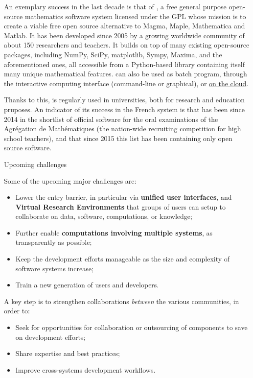 \documentclass[12pt]{amsart}
\makeatletter
\def\subsection{\@startsection{subsection}{2}%
  \z@{.3\linespacing\@plus.5\linespacing}{.1\linespacing}%
  {\normalfont\bfseries}}
\makeatother
\begin{document}
An exemplary success in the last decade is that of \Sage,
a free general purpose open-source mathematics
software system licensed under the GPL whose mission is to create a
viable free open source alternative to Magma, Maple, Mathematica and
Matlab. It has been developed since 2005 by a growing worldwide community of
about 150 researchers and teachers. It builds on top of many existing
open-source packages, including NumPy, SciPy, matplotlib, Sympy,
Maxima, and the aforementioned ones, all accessible from a
Python-based library containing itself many unique mathematical
features. \Sage can also be used as batch program, through the
\Jupyter interactive computing interface (command-line or graphical),
or \href{cloud.sagemath.org}{on the cloud}.

Thanks to this, \Sage is regularly used in universities, both for
research and education pruposes.  An indicator of its success in the French
system is that \Sage has been since 2014 in the shortlist of official
software for the oral examinations of the Agrégation de Mathématiques
(the nation-wide recruiting competition for high school teachers), and
that since 2015 this list has been containing only open source software.

\subsection{Upcoming challenges}

Some of the upcoming major challenges are:
\begin{itemize}
\item Lower the entry barrier, in particular via \textbf{unified user
    interfaces}, and \textbf{Virtual Research Environments} that
  groups of users can setup to collaborate on data, software,
  computations, or knowledge;
\item Further enable \textbf{computations involving multiple systems},
  as transparently as possible;
\item Keep the development efforts manageable as the size and
  complexity of software systems increase;
\item Train a new generation of users and developers.
\end{itemize}

A key step is to strengthen collaborations \emph{between} the various
communities, in order to:
\begin{itemize}
\item Seek for opportunities for collaboration or outsourcing of
  components to save on development efforts;
\item Share expertise and best practices;
\item Improve cross-systems development workflows.
\end{itemize}
\end{document}
